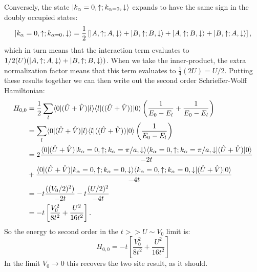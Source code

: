 \documentclass[12pt]{article}
\DeclarePairedDelimiter\bra{\langle}{\rvert} %
\DeclarePairedDelimiter\ket{\lvert}{\rangle}%
\numberwithin{equation}{section}
\begin{document}
Conversely, the state $\ket{k_\alpha=0,\uparrow;k_{\alpha=0},\downarrow}$ expands to have the same sign in the doubly occupied states:
\begin{align}
    \ket{k_\alpha=0,\uparrow;k_{\alpha=0},\downarrow}
    =\frac{1}{2}\left[\ket{A,\uparrow;A,\downarrow}+\ket{B,\uparrow;B,\downarrow}
    +\ket{A,\uparrow;B,\downarrow}+\ket{B,\uparrow;A,\downarrow}\right],
\end{align}
which in turn means that the interaction term evaluates to $1/2(U)(\ket{A,\uparrow;A,\downarrow}+\ket{B,\uparrow;B,\downarrow})$. When we take the inner-product, the extra normalization factor means that this term evaluates to $\frac{1}{4}(2U)=U/2$. Putting these results together we can then write out the second order Schrieffer-Wolff Hamiltonian:
\begin{align}
    H_{0,0}&=\frac{1}{2}\sum_{l}\bra{0}(\hat{U}+\hat{V})\ket{l}\bra{l}((\hat{U}+\hat{V}))\ket{0}
    \left(
        \frac{1}{E_{0}-E_{l}}+\frac{1}{E_{0}-E_{l}}
    \right)\\
    &=\sum_{l}\bra{0}(\hat{U}+\hat{V})\ket{l}\bra{l}((\hat{U}+\hat{V}))\ket{0}
    \left(
        \frac{1}{E_{0}-E_{l}}
    \right)\\
    &=2
    \frac{\bra{0}(\hat{U}+\hat{V})\ket{k_\alpha=0,\uparrow;k_\alpha=\pi/a,\downarrow}\bra{k_\alpha=0,\uparrow;k_\alpha=\pi/a,\downarrow}(\hat{U}+\hat{V})\ket{0}}
    {-2t}\\
    &+ \frac{\bra{0}(\hat{U}+\hat{V})\ket{k_\alpha=0,\uparrow;k_\alpha=0,\downarrow}\bra{k_\alpha=0,\uparrow;k_\alpha=0,\downarrow}(\hat{U}+\hat{V})\ket{0}}
    {-4t}\\
    &=-t\frac{((V_0/2)^2)}{-2t}-t\frac{(U/2)^2}{-4t}\\
    &=-t\left[\frac{V_0^2}{8t^2}+\frac{U^2}{16t^2}\right].
\end{align}
So the energy to second order in the $t>>U\sim V_0$ limit is:
\begin{equation}
\boxed{
    H_{0,0}=-t\left[\frac{V_0^2}{8t^2}+\frac{U^2}{16t^2}\right]
}
\end{equation}
In the limit $V_0\to 0$ this recovers the two site result, as it should. 
\end{document}
